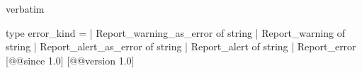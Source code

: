 \begin{camlexample}{verbatim}
\begin{caml}
\begin{camlinput}
type error_kind =
  | Report_warning_as_error of string
  | Report_warning of string
  | Report_alert_as_error of string
  | Report_alert of string
  | Report_error
[@@since 1.0] [@@version 1.0]
\end{camlinput}
\end{caml}
\end{camlexample}
